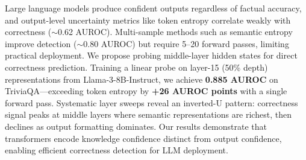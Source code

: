 Large language models produce confident outputs regardless of factual accuracy, and output-level uncertainty metrics like token entropy correlate weakly with correctness ($\sim$0.62 AUROC). Multi-sample methods such as semantic entropy improve detection ($\sim$0.80 AUROC) but require 5--20 forward passes, limiting practical deployment. We propose probing middle-layer hidden states for direct correctness prediction. Training a linear probe on layer-15 (50\% depth) representations from Llama-3-8B-Instruct, we achieve \textbf{0.885 AUROC} on TriviaQA---exceeding token entropy by \textbf{+26 AUROC points} with a single forward pass. Systematic layer sweeps reveal an inverted-U pattern: correctness signal peaks at middle layers where semantic representations are richest, then declines as output formatting dominates. Our results demonstrate that transformers encode knowledge confidence distinct from output confidence, enabling efficient correctness detection for LLM deployment.
